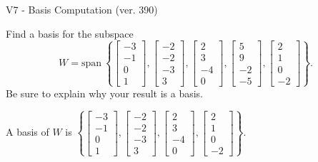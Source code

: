 \begin{exercise}
  \begin{exerciseTitle}V7 - Basis Computation (ver. 390)\end{exerciseTitle}
  \begin{exerciseStatement}
    Find a basis for the subspace 
\[W=\mathrm{span}\ \left\{\left[\begin{array}{r}
-3 \\
-1 \\
0 \\
1
\end{array}\right] , \left[\begin{array}{r}
-2 \\
-2 \\
-3 \\
3
\end{array}\right] , \left[\begin{array}{r}
2 \\
3 \\
-4 \\
0
\end{array}\right] , \left[\begin{array}{r}
5 \\
9 \\
-2 \\
-5
\end{array}\right] , \left[\begin{array}{r}
2 \\
1 \\
0 \\
-2
\end{array}\right]\right\}.\]
 Be sure to explain why your result is a basis.


  \end{exerciseStatement}
  \begin{exerciseAnswer}
   A basis of \(W\) is  \(\left\{\left[\begin{array}{r}
-3 \\
-1 \\
0 \\
1
\end{array}\right] , \left[\begin{array}{r}
-2 \\
-2 \\
-3 \\
3
\end{array}\right] , \left[\begin{array}{r}
2 \\
3 \\
-4 \\
0
\end{array}\right] , \left[\begin{array}{r}
2 \\
1 \\
0 \\
-2
\end{array}\right]\right\}\).
  


  \end{exerciseAnswer}
\end{exercise}